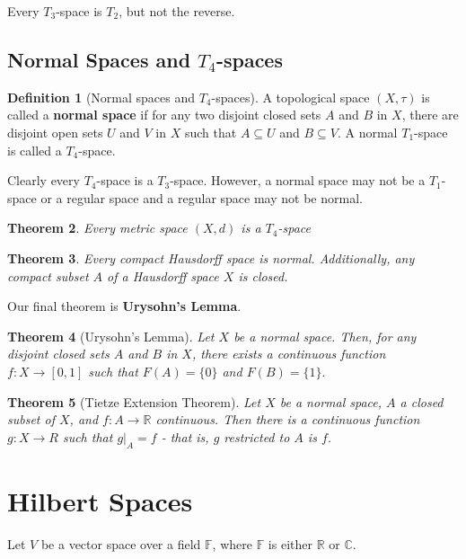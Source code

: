 \documentclass[10pt, oneside, reqno]{amsart}
\theoremstyle{plain}%
\newtheorem{thm}{Theorem}[section]
\theoremstyle{definition}
\newtheorem{defn}[thm]{Definition}
\theoremstyle{remark}
\newcommand{\R}{\mathbb{R}}
\newcommand{\C}{\mathbb{C}}
\newcommand{\F}{\mathbb{F}}
\newcommand{\met}{(X,d)}
\newcommand{\topo}{(X,\tau)}
\begin{document}
Every $T_3$-space is $T_2$, but not the reverse.


\subsection{Normal Spaces and $T_4$-spaces} %
\label{sub:normal_spaces_and_t_4_spaces}

\begin{defn}[Normal spaces and $T_4$-spaces]
	A topological space $\topo$ is called a \textbf{normal space} if for any two disjoint closed sets $A$ and $B$ in $X$, there are disjoint open sets $U$ and $V$ in $X$ such that $A \subseteq U$ and $B \subseteq V$.  A normal $T_1$-space is called a $T_4$-space.
\end{defn}

Clearly every $T_4$-space is a $T_3$-space.  However, a normal space may not be a $T_1$-space or a regular space and a regular space may not be normal.

\begin{thm}
	Every metric space $\met$ is a $T_4$-space
\end{thm}

\begin{thm}
	Every compact Hausdorff space is normal.  Additionally, any compact subset $A$ of a Hausdorff space $X$ is closed.
\end{thm}

Our final theorem is \textbf{Urysohn's Lemma}.
\begin{thm}[Urysohn's Lemma]
	Let $X$ be a normal space.  Then, for any disjoint closed sets $A$ and $B$ in $X$, there exists a continuous function $f: X \rightarrow [0,1]$ such that $F(A) = \{0 \}$ and $F(B) = \{1 \}.$
\end{thm}

\begin{thm}[Tietze Extension Theorem]
	Let $X$ be a normal space, $A$ a closed subset of $X$, and $f : A \rightarrow \R$ continuous.  Then there is a continuous function $g: X \rightarrow R$ such that $g |_A = f$ - that is, $g$ restricted to $A$ is $f$. 
\end{thm}


\section{Hilbert Spaces} %
\label{sec:hilbert_spaces}
Let $V$ be a vector space over a field $\F$, where $\F$ is either $\R$ or $\C$.
\end{document}
